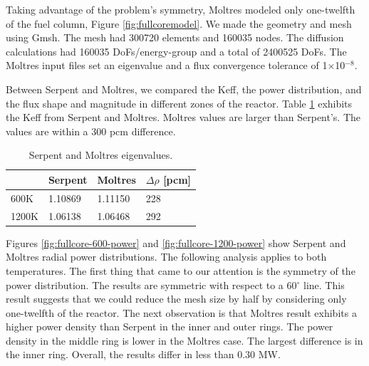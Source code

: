 \documentclass[11pt,letterpaper]{article}
\begin{document}
Taking advantage of the problem's symmetry, Moltres modeled only one-twelfth of the fuel column, Figure \ref{fig:fullcoremodel}.
We made the geometry and mesh using Gmsh.
The mesh had 300720 elements and 160035 nodes.
The diffusion calculations had 160035 \glspl{DoF}/energy-group and a total of 2400525 DoFs.
The Moltres input files set an eigenvalue and a flux convergence tolerance of 1$\times$10$^{-8}$.

Between Serpent and Moltres, we compared the \gls{Keff}, the power distribution, and the flux shape and magnitude in different zones of the reactor.
Table \ref{tab:full-keff} exhibits the \gls{Keff} from Serpent and Moltres.
Moltres values are larger than Serpent's.
The values are within a 300 pcm difference.

\begin{table}[htbp!]
  \centering
  \caption{Serpent and Moltres eigenvalues.}
  \begin{tabular}{l|lll}
  \toprule
              & Serpent			& Moltres  & $\Delta \rho$ [pcm] 	\\
  \midrule
			 600K  	& 1.10869     & 1.11150	 &	228		\\
			1200K 	& 1.06138     & 1.06468	 &	292   \\

  \bottomrule
  \end{tabular}
  \label{tab:full-keff}
\end{table}

Figures \ref{fig:fullcore-600-power} and \ref{fig:fullcore-1200-power} show Serpent and Moltres radial power distributions.
The following analysis applies to both temperatures.
The first thing that came to our attention is the symmetry of the power distribution.
The results are symmetric with respect to a 60$^{\circ}$ line.
This result suggests that we could reduce the mesh size by half by considering only one-twelfth of the reactor.
The next observation is that Moltres result exhibits a higher power density than Serpent in the inner and outer rings.
The power density in the middle ring is lower in the Moltres case.
The largest difference is in the inner ring.
Overall, the results differ in less than 0.30 MW.
\end{document}
